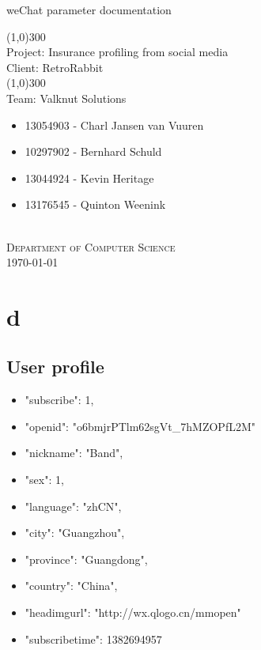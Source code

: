 \documentclass{article}
\begin{document}
	\begin{titlepage}
		\begin{center}
			\huge{
			weChat parameter documentation\\
			}
			
			\line(1,0){300}\\
			[0.2cm]
			\LARGE{Project: Insurance profiling from social media\\
			Client: RetroRabbit} \\
			\line(1,0){300}\\
			\LARGE{Team: Valknut Solutions}\\
			[1.0cm]
			\large
			{
			\begin{itemize}
				\item 13054903 - Charl Jansen van Vuuren 
				\item 10297902 - Bernhard Schuld      
				\item 13044924 - Kevin Heritage
				\item 13176545 - Quinton Weenink\\
			\end{itemize}
			}
			\textsc{\large}\\
		[3.0cm]
		\textsc{\large  Department of Computer Science}\\
		[0.5cm]
		\textsc{\large \today}\\
		\end{center}

	\end{titlepage}
	\cleardoublepage
	\tableofcontents
\section{d}
\subsection{User profile}
\begin{itemize}
	\item "subscribe": 1, 
	\item "openid": "o6bmjrPTlm62sgVt\_7hMZOPfL2M"
	\item "nickname": "Band", 
	\item "sex": 1, 
	\item "language": "zhCN", 
	\item "city": "Guangzhou", 
	\item "province": "Guangdong", 
	\item "country": "China", 
	\item "headimgurl":    "http://wx.qlogo.cn/mmopen"
	\item "subscribetime": 1382694957
\end{itemize}
\end{document}
